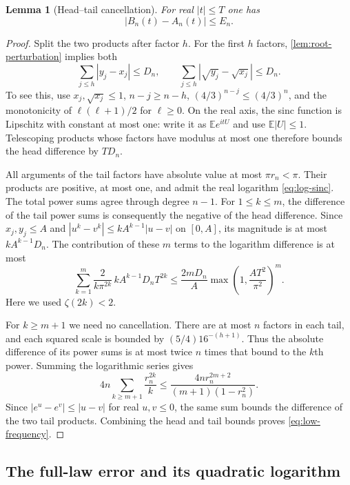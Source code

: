\documentclass[11pt,a4paper]{article}
\numberwithin{equation}{section}
\newtheorem{lemma}[theorem]{Lemma}
\theoremstyle{definition}
\theoremstyle{remark}
\newcommand{\E}{\mathbb E}
\begin{document}
\begin{lemma}[Head--tail cancellation]\label{lem:low-frequency}
For real $|t|\le T$ one has
\begin{equation}
 |B_n(t)-A_n(t)|\le E_n.
 \label{eq:low-frequency}
\end{equation}
\end{lemma}
\begin{proof}
Split the two products after factor $h$. For the first $h$ factors,
\cref{lem:root-perturbation} implies both
\begin{equation}
 \sum_{j\le h}|y_j-x_j|\le D_n,
 \qquad
 \sum_{j\le h}|\sqrt{y_j}-\sqrt{x_j}|\le D_n.
 \label{eq:head-change}
\end{equation}
To see this, use $x_j,\sqrt{x_j}\le1$, $n-j\ge n-h$,
$(4/3)^{n-j}\le(4/3)^n$, and the monotonicity of
$\ell(\ell+1)/2$ for $\ell\ge0$.
On the real axis, the sinc function is Lipschitz with constant at most one:
write it as $\E e^{itU}$ and use $\E|U|\le1$. Telescoping products whose
factors have modulus at most one therefore bounds the head difference by
$TD_n$.

All arguments of the tail factors have absolute value at most $\pi r_n<\pi$.
Their products are positive, at most one, and admit the real logarithm
\eqref{eq:log-sinc}. The total power sums agree through degree $n-1$.
For $1\le k\le m$, the difference of the tail power sums is consequently
the negative of the head difference. Since $x_j,y_j\le A$ and
$|u^k-v^k|\le kA^{k-1}|u-v|$ on $[0,A]$, its magnitude is at most
$kA^{k-1}D_n$. The contribution of these $m$ terms to the logarithm
difference is at most
\[
 \sum_{k=1}^m\frac{2}{k\pi^{2k}}\,kA^{k-1}D_n T^{2k}
 \le\frac{2mD_n}{A}\max\left(1,\frac{AT^2}{\pi^2}\right)^m.
\]
Here we used $\zeta(2k)<2$.

For $k\ge m+1$ we need no cancellation. There are at most $n$ factors in
each tail, and each squared scale is bounded by
$(5/4)16^{-(h+1)}$. Thus the absolute difference of its power sums is at
most twice $n$ times that bound to the $k$th power. Summing the logarithmic
series gives
\[
 4n\sum_{k\ge m+1}\frac{r_n^{2k}}k
 \le\frac{4n r_n^{2m+2}}{(m+1)(1-r_n^2)}.
\]
Since $|e^u-e^v|\le|u-v|$ for real $u,v\le0$, the same sum bounds
the difference of the two tail products. Combining the head and tail
bounds proves \eqref{eq:low-frequency}.
\end{proof}

\subsection{The full-law error and its quadratic logarithm}
\end{document}
